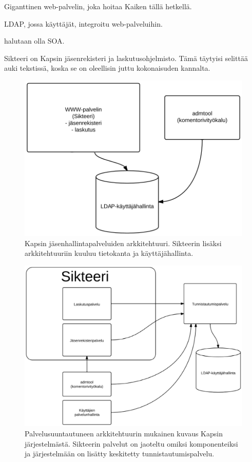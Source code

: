 

Giganttinen web-palvelin, joka hoitaa Kaiken tällä hetkellä.

LDAP, jossa käyttäjät, integroitu web-palveluihin.

halutaan olla SOA.

Sikteeri on Kapsin jäsenrekisteri ja laskutusohjelmisto. Tämä täytyisi selittää auki tekstissä, koska se on oleellisin juttu kokonaisuden kannalta.


\begin{figure}[h]
\centering
\includegraphics[width=.7\textwidth]{toteutus/kapsi_nykyinen.eps}
\caption{Kapsin jäsenhallintapalveluiden arkkitehtuuri. Sikteerin lisäksi arkkitehtuuriin kuuluu tietokanta ja käyttäjähallinta.}%
\label{kapsi_nykyinen}
\end{figure}

\begin{figure}[h]
\centering
\includegraphics[width=.7\textwidth]{toteutus/kapsi_uusi.eps}
\caption{Palvelusuuntautuneen arkkitehtuurin mukainen kuvaus Kapsin järjestelmästä. Sikteerin palvelut on jaoteltu omiksi komponenteiksi ja järjestelmään on lisätty keskitetty tunnistautumispalvelu.}%
\label{kapsi_uusi}
\end{figure}
